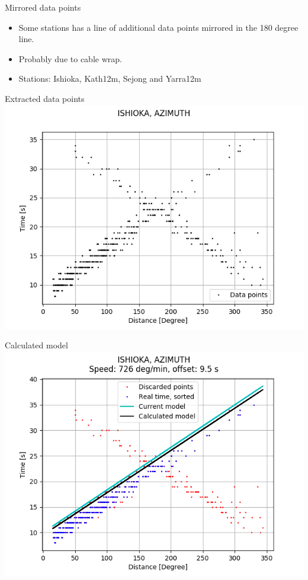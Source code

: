 \documentclass{beamer}
\begin{document}
    \begin{frame}{Mirrored data points}
        \begin{itemize}[<+-|alert@+>]
            \item Some stations has a line of additional data points mirrored
            in the 180 degree line.
            \item Probably due to cable wrap.
            \item Stations: Ishioka, Kath12m, Sejong and Yarra12m
        \end{itemize}
    \end{frame}
    \begin{frame}{Extracted data points}
        \centering
        \includegraphics[width=1\columnwidth]{ISHIOKA_AZIMUT_DATA}
    \end{frame}
    \begin{frame}{Calculated model}
        \centering
        \includegraphics[width=1\columnwidth]{ISHIOKA_AZIMUT}
    \end{frame}
\end{document}
